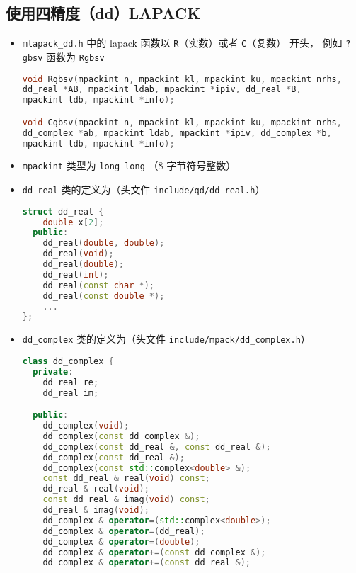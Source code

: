 \subsection{使用四精度（dd）LAPACK}
\begin{itemize}
\item \verb|mlapack_dd.h| 中的 lapack 函数以 \verb|R|（实数）或者 \verb|C|（复数） 开头， 例如 \verb|?gbsv| 函数为 \verb|Rgbsv|
\begin{lstlisting}[language=cpp]
void Rgbsv(mpackint n, mpackint kl, mpackint ku, mpackint nrhs,
dd_real *AB, mpackint ldab, mpackint *ipiv, dd_real *B,
mpackint ldb, mpackint *info);

void Cgbsv(mpackint n, mpackint kl, mpackint ku, mpackint nrhs,
dd_complex *ab, mpackint ldab, mpackint *ipiv, dd_complex *b,
mpackint ldb, mpackint *info);
\end{lstlisting}

\item \verb|mpackint| 类型为 \verb|long long| （8 字节符号整数）
\item \verb|dd_real| 类的定义为（头文件 \verb|include/qd/dd_real.h|）
\begin{lstlisting}[language=cpp]
struct dd_real {
    double x[2];
  public:
    dd_real(double, double);
    dd_real(void);
    dd_real(double);
    dd_real(int);
    dd_real(const char *);
    dd_real(const double *);
    ...
};
\end{lstlisting}
\item \verb|dd_complex| 类的定义为（头文件 \verb|include/mpack/dd_complex.h|）
\begin{lstlisting}[language=cpp]
class dd_complex {
  private:
    dd_real re;
    dd_real im;

  public:
    dd_complex(void);
    dd_complex(const dd_complex &);
    dd_complex(const dd_real &, const dd_real &);
    dd_complex(const dd_real &);
    dd_complex(const std::complex<double> &);
    const dd_real & real(void) const;
    dd_real & real(void);
    const dd_real & imag(void) const;
    dd_real & imag(void);
    dd_complex & operator=(std::complex<double>);
    dd_complex & operator=(dd_real);
    dd_complex & operator=(double);
    dd_complex & operator+=(const dd_complex &);
    dd_complex & operator+=(const dd_real &);
\end{lstlisting}
\end{itemize}

